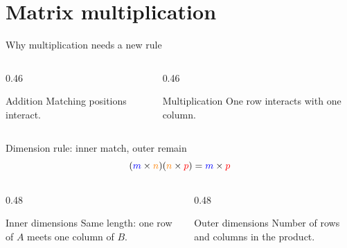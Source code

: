 \def\sectiontag{Rows meet columns, and order becomes meaningful}
\section{Matrix multiplication}

\begin{frame}{Why multiplication needs a new rule}
  \begin{columns}[T,onlytextwidth]
    \begin{column}{0.46\textwidth}
      \begin{block}{Addition}
        Matching positions interact.
      \end{block}
    \end{column}
    \begin{column}{0.46\textwidth}
      \begin{exampleblock}{Multiplication}
        One row interacts with one column.
      \end{exampleblock}
    \end{column}
  \end{columns}

  \vspace{0.8cm}
\end{frame}

\begin{frame}{Dimension rule: inner match, outer remain}
  \centering
  \LARGE
  \[
  (\textcolor{blue}{m}\times\textcolor{orange}{n})(\textcolor{orange}{n}\times\textcolor{red}{p})
  =\textcolor{blue}{m}\times\textcolor{red}{p}
  \]

  \vspace{0.25cm}
  \begin{columns}[T,onlytextwidth]
    \begin{column}{0.48\textwidth}
      \begin{exampleblock}{Inner dimensions}
        Same length: one row of $A$ meets one column of $B$.
      \end{exampleblock}
    \end{column}
    \begin{column}{0.48\textwidth}
      \begin{block}{Outer dimensions}
        Number of rows and columns in the product.
      \end{block}
    \end{column}
  \end{columns}
\end{frame}
